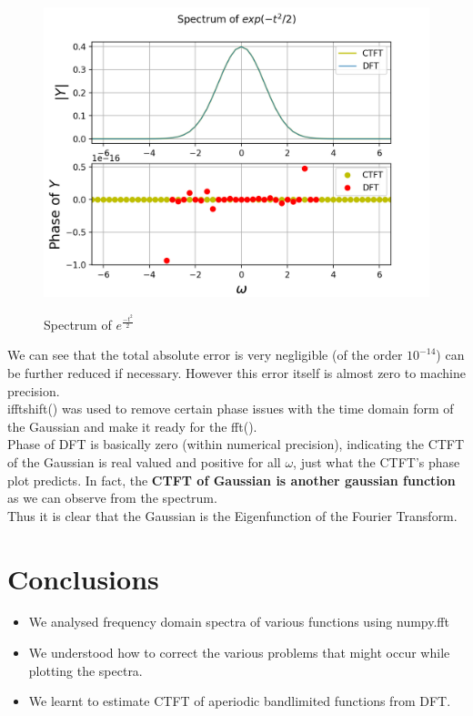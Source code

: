 \documentclass[11pt, a4paper]{article}
\begin{document}
\begin{figure}[H]
   	\centering
   	\includegraphics[scale=0.8]{gaussian.png}
   	\label{fig:gaussian}
   	\caption{Spectrum of $e^{\frac{-t^2}{2}}$}
\end{figure}

{
We can see that the total absolute error is very negligible (of the order $10^{-14}$) can be further reduced if necessary. However this error itself is almost zero to machine precision.
\\ifftshift() was used to remove certain phase issues with the time domain form of the Gaussian and make it ready for the fft().
\\Phase of DFT is basically zero (within numerical precision), indicating the CTFT of the Gaussian is real valued and positive for all $\omega$, just what the CTFT's phase plot predicts. In fact, the \textbf{CTFT of Gaussian is another gaussian function} as we can observe from the spectrum.
\\Thus it is clear that the Gaussian is the Eigenfunction of the Fourier Transform. 
}


\section{Conclusions}
\begin{itemize}
\item We analysed frequency domain spectra of various functions using numpy.fft
\item We understood how to correct the various problems that might occur while plotting the spectra.
\item We learnt to estimate CTFT of aperiodic bandlimited functions from DFT.
\end{itemize}
\end{document}
